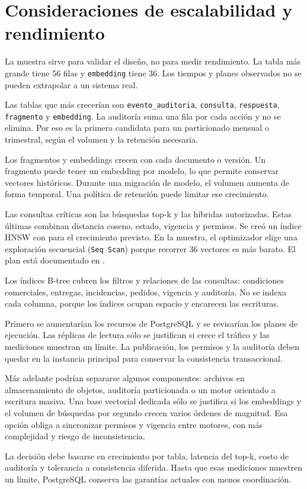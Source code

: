 \section{Consideraciones de escalabilidad y rendimiento}

La muestra sirve para validar el diseño, no para medir rendimiento. La tabla más
grande tiene 56 filas y \texttt{embedding} tiene 36. Los tiempos y planes
observados no se pueden extrapolar a un sistema real.

Las tablas que más crecerían son \texttt{evento\_auditoria}, \texttt{consulta},
\texttt{respuesta}, \texttt{fragmento} y \texttt{embedding}. La auditoría suma
una fila por cada acción y no se elimina. Por eso es la primera candidata para
un particionado mensual o trimestral, según el volumen y la retención necesaria.

Los fragmentos y embeddings crecen con cada documento o versión. Un fragmento
puede tener un embedding por modelo, lo que permite conservar vectores
históricos. Durante una migración de modelo, el volumen aumenta de forma
temporal. Una política de retención puede limitar ese crecimiento.

Las consultas críticas son las búsquedas top-k y las híbridas autorizadas. Estas
últimas combinan distancia coseno, estado, vigencia y permisos. Se creó un índice
HNSW con  para el crecimiento previsto. En la
muestra, el optimizador elige una exploración secuencial (\texttt{Seq Scan})
porque recorrer 36 vectores es más barato. El plan está documentado en
.

Los índices B-tree cubren los filtros y relaciones de las consultas: condiciones
comerciales, entregas, incidencias, pedidos, vigencia y auditoría. No se indexa
cada columna, porque los índices ocupan espacio y encarecen las escrituras.

Primero se aumentarían los recursos de PostgreSQL y se revisarían los planes de
ejecución. Las réplicas de lectura sólo se justifican si crece el tráfico y las
mediciones muestran un límite. La publicación, los permisos y la auditoría deben
quedar en la instancia principal para conservar la consistencia transaccional.

Más adelante podrían separarse algunos componentes: archivos en almacenamiento
de objetos, auditoría particionada o un motor orientado a escritura masiva. Una
base vectorial dedicada sólo se justifica si los embeddings y el volumen de
búsquedas por segundo crecen varios órdenes de magnitud. Esa opción obliga a
sincronizar permisos y vigencia entre motores, con más complejidad y riesgo de
inconsistencia.

La decisión debe basarse en crecimiento por tabla, latencia del top-k, costo de
auditoría y tolerancia a consistencia diferida. Hasta que esas mediciones muestren
un límite, PostgreSQL conserva las garantías actuales con menos coordinación.
